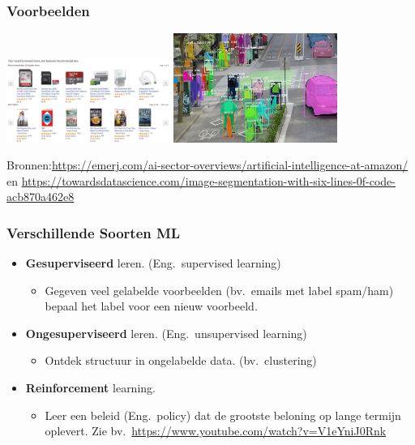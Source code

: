 \documentclass[aspectratio=169]{beamer}
\begin{document}
\begin{frame}
\frametitle{Voorbeelden}
\begin{center}
\includegraphics[width=0.4\textwidth]{graphics/amazon-recommendation}
\quad
\includegraphics[width=0.4\textwidth]{graphics/beeld-segmentatie}
\end{center}
\tiny{Bronnen:\url{https://emerj.com/ai-sector-overviews/artificial-intelligence-at-amazon/} en  \url{https://towardsdatascience.com/image-segmentation-with-six-lines-0f-code-acb870a462e8}}
\end{frame}

\begin{frame}
\frametitle{Verschillende Soorten ML}

\begin{itemize}
	\item \textbf{Gesuperviseerd} leren. (Eng.\ supervised learning)
	\begin{itemize}
		\item Gegeven veel gelabelde voorbeelden (bv.\ emails met label spam/ham) bepaal het label voor een nieuw voorbeeld.
	\end{itemize}
	\item \textbf{Ongesuperviseerd} leren. (Eng.\ unsupervised learning)	
	\begin{itemize}
		\item Ontdek structuur in ongelabelde data. (bv.\ clustering)
	\end{itemize}
	\item \textbf{Reinforcement} learning.
	\begin{itemize}
		\item Leer een beleid (Eng.\ policy) dat de grootste beloning op lange termijn oplevert.
		Zie bv.\ \url{https://www.youtube.com/watch?v=V1eYniJ0Rnk}
	\end{itemize}
\end{itemize}
\end{frame}
\end{document}
